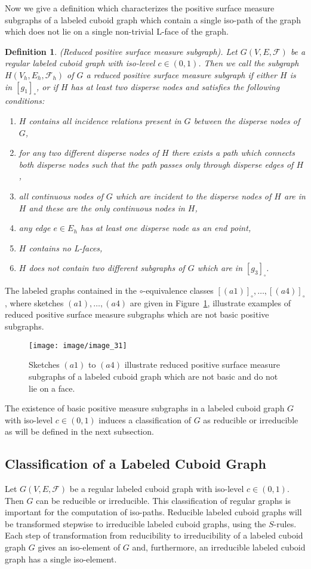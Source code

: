 \documentclass[a4paper,11pt]{article}
\newtheorem{definition}[theorem]{Definition}
\begin{document}
Now we give a definition which characterizes the positive surface measure subgraphs of a labeled cuboid graph
which contain a single iso-path of the graph which does not lie on a single non-trivial L-face of the graph.
\begin{definition}(Reduced positive surface measure subgraph). Let $G(V,E,\mathcal{F})$ be a regular
labeled cuboid graph with iso-level $c\in (0,1)$. Then we call the subgraph $H(V_h,E_h,\mathcal{F}_h)$
of $G$ a reduced positive surface measure subgraph if either $H$ is in $[g_1]_{\circ}$, or if $H$ has at
least two disperse nodes and satisfies the following conditions:
\begin{enumerate}
\item $H$ contains all incidence relations present in $G$ between the disperse nodes of
$G$,
\item for any two different disperse nodes of $H$ there exists a path which connects both disperse nodes such that
the path passes only through disperse edges of $H$,
\item all continuous nodes of $G$ which are incident to the disperse nodes of $H$ are in $H$ and these
are the only continuous nodes in $H$,
\item any edge $e\in E_h$ has at least one disperse node as an end point,
\item $H$ contains no L-faces,
\item $H$ does not contain two different subgraphs of $G$ which are in $[g_3]_{\square}$.
\end{enumerate}
\label{def:positive-surface-measure-graph}
\end{definition}
The labeled graphs contained in the $\circ$-equivalence classes $[(a1)]_{\circ},\ldots,[(a4)]_{\circ}$,
where sketches $(a1),\ldots,(a4)$ are given in Figure~\ref{image_31}, illustrate examples of reduced
positive surface measure subgraphs which are not basic positive subgraphs.
\begin{figure}[!ht]
\texttt{[image: image/image\_31]}
\caption{Sketches $(a1)$ to $(a4)$ illustrate reduced positive surface measure subgraphs of a labeled
cuboid graph which are not basic and do not lie on a face.}
\label{image_31}
\end{figure}
\FloatBarrier
The existence of basic positive measure subgraphs in a labeled cuboid graph $G$ with iso-level $c\in (0,1)$
induces a classification of $G$ as reducible or irreducible as will be defined in the next subsection.

\subsection{Classification of a Labeled Cuboid Graph}
Let $G(V,E,\mathcal{F})$ be a regular labeled cuboid graph with iso-level $c\in (0,1)$. Then $G$ can
be reducible or irreducible. This classification of regular graphs is important for the computation of
iso-paths. Reducible labeled cuboid graphs will be transformed stepwise to irreducible labeled cuboid
graphs, using the $S$-rules. Each step of transformation from reducibility to irreducibility of a
labeled cuboid graph $G$ gives an iso-element of $G$ and, furthermore, an irreducible labeled cuboid
graph has a single iso-element.
\end{document}
